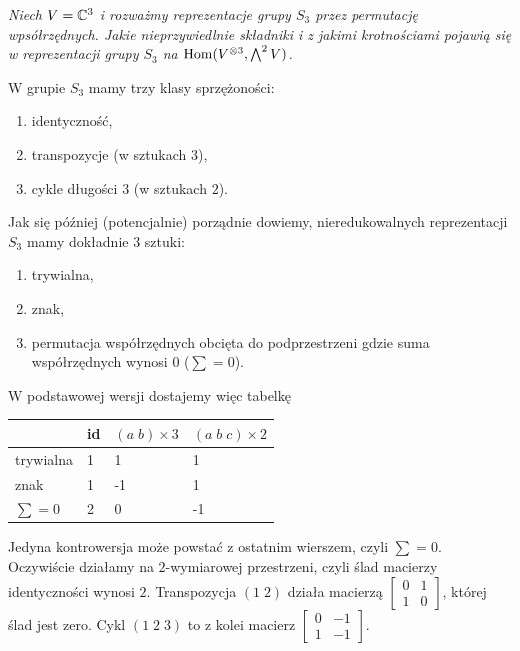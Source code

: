 \begin{example}
  {\slshape Niech $V=\mathbb{C}^3$ i rozważmy reprezentacje grupy $S_3$ przez permutację wpsółrzędnych. Jakie nieprzywiedlnie składniki i z jakimi krotnościami pojawią się w reprezentacji grupy $S_3$ na $\operatorname{Hom}(V^{\otimes 3}, \bigwedge^2 V)$.}

  W grupie $S_3$ mamy trzy klasy sprzężoności: 
  \begin{enumerate}
    \item identyczność,
    \item transpozycje (w sztukach $3$),
    \item cykle długości $3$ (w sztukach $2$).
  \end{enumerate}
  Jak się później (potencjalnie) porządnie dowiemy, nieredukowalnych reprezentacji $S_3$ mamy dokładnie $3$ sztuki:
  \begin{enumerate}
    \item trywialna,
    \item znak,
    \item permutacja współrzędnych obcięta do podprzestrzeni gdzie suma współrzędnych wynosi $0$ ($\sum=0$).
  \end{enumerate}

  W podstawowej wersji dostajemy więc tabelkę
  \bigskip

  \begin{center}
    \begin{tabular}{|p{3cm}|p{2cm}|p{2cm}|p{2cm}|}
      \hline
      & id & $(a\;b)\times 3$ & $(a\;b\;c)\times 2$ \\ 
      \hline 
      trywialna & 1 & 1 & 1 \\ 
      \hline 
      znak & 1 & -1 & 1 \\ 
      \hline 
      $\sum=0$ & 2 & 0 & -1 \\ 
      \hline
    \end{tabular}
  \end{center}
  \bigskip

  Jedyna kontrowersja może powstać z ostatnim wierszem, czyli $\sum=0$. Oczywiście działamy na $2$-wymiarowej przestrzeni, czyli ślad macierzy identyczności wynosi $2$. Transpozycja $(1\;2)$ działa macierzą $\begin{bmatrix}0 & 1\\ 1 & 0 \end{bmatrix}$, której ślad jest zero. Cykl $(1\;2\;3)$ to z kolei macierz $\begin{bmatrix}0 & -1\\ 1 & -1 \end{bmatrix}$.


\end{example}
